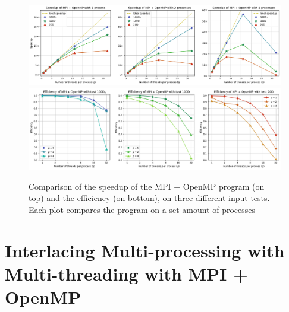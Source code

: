 \documentclass[11pt, journal]{IEEEtran}
\begin{document}
\begin{figure}
    \label{stats_mpi_omp}
    \centering
    \includegraphics[width=\linewidth]{imgs/mpi_omp_speedup.png}
    \includegraphics[width=\linewidth]{imgs/mpi_omp_efficiency.png}

    \caption{Comparison of the speedup of the MPI + OpenMP program (on top) and the efficiency (on bottom), on three different input tests. Each plot compares the program on a set amount of processes}
\end{figure}

\section{Interlacing Multi-processing with Multi-threading with MPI + OpenMP}
\end{document}
